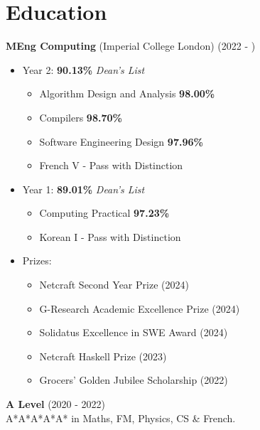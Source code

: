 \documentclass{Resume}
\begin{document}

	\section{Education}
	\textbf{MEng Computing} (Imperial College London) \hfill (2022 - )
 \begin{itemize}
     \item Year 2: \textbf{90.13\%} \textit{Dean's List} \begin{itemize}
         \item Algorithm Design and Analysis \textbf{98.00\%}
         \item Compilers \textbf{98.70\%}
         \item Software Engineering Design \textbf{97.96\%}
         \item French V - Pass with Distinction
     \end{itemize}
     \item Year 1: \textbf{89.01\%} \textit{Dean's List} \begin{itemize}
         \item Computing Practical \textbf{97.23\%}
         \item Korean I - Pass with Distinction
     \end{itemize}
     \item Prizes: \begin{itemize}
         \item Netcraft Second Year Prize (2024)
         \item G-Research Academic Excellence Prize (2024)
         \item Solidatus Excellence in SWE Award (2024)
         \item Netcraft Haskell Prize (2023)
         \item Grocers' Golden Jubilee Scholarship (2022)
     \end{itemize}
 \end{itemize}
		\textbf{A Level} \hfill (2020 - 2022) \\
                A*A*A*A*A* in Maths, FM, Physics, CS \& French.
            
\end{document}
